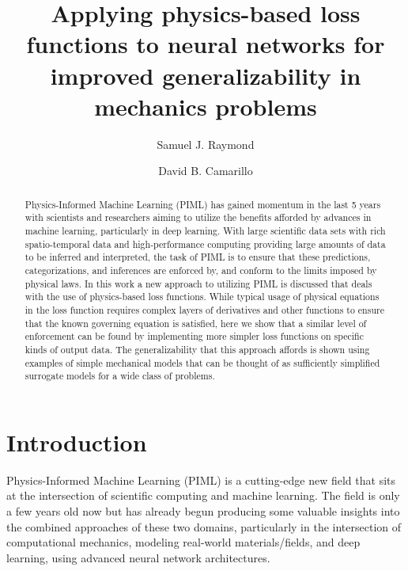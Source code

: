 \documentclass[3p]{elsarticle}
\date{}
\begin{document}
\begin{frontmatter}

\title{Applying physics-based loss functions to neural networks for improved generalizability in mechanics problems}
\author[BioE]{Samuel J. Raymond}
\author[BioE,Neuro,MechE]{David B. Camarillo}
\address[BioE]{Department of Bioengineering, Stanford University, Stanford, CA, 94305, USA}
\address[Neuro]{Department of Neurosurgery, Stanford University, Stanford, CA, 94305, USA.}
\address[MechE]{ Department of Mechanical Engineering, Stanford University, Stanford, CA, 94305,USA}
\begin{abstract}
Physics-Informed Machine Learning (PIML) has gained momentum in the last 5 years with scientists and researchers aiming to utilize the benefits afforded by advances in machine learning, particularly in deep learning. With large scientific data sets with rich spatio-temporal data and high-performance computing providing large amounts of data to be inferred and interpreted, the task of PIML is to ensure that these predictions, categorizations, and inferences are enforced by, and conform to the limits imposed by physical laws. In this work a new approach to utilizing PIML is discussed that deals with the use of physics-based loss functions. While typical usage of physical equations in the loss function requires complex layers of derivatives and other functions to ensure that the known governing equation is satisfied, here we show that a similar level of enforcement can be found by implementing more simpler loss functions on specific kinds of output data. The generalizability that this approach affords is shown using examples of simple mechanical models that can be thought of as sufficiently simplified surrogate models for a wide class of problems.
\end{abstract}

\end{frontmatter}


\section{Introduction}
Physics-Informed Machine Learning (PIML) is a cutting-edge new field that sits at the intersection of scientific computing and machine learning. The field is only a few years old now but has already begun producing some valuable insights into the combined approaches of these two domains, particularly in the intersection of computational mechanics, modeling real-world materials/fields, and deep learning, using advanced neural network architectures. 
\end{document}
